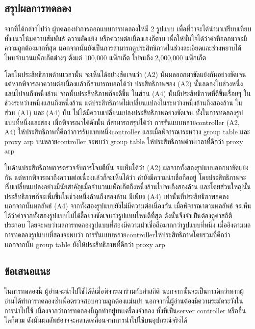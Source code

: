 \subsection{สรุปผลการทดลอง}

จากที่ได้กล่าวไปว่า ผู้ทดลองทำการออกแบบการทดลองให้มี 2 รูปแบบ เพื่อที่ว่าจะได้นำมาเปรียบเทียบ
ทั้งแนวโน้มความสัมพันธ์ ความขัดแย้ง หรือความต่อเนื่องเองก็ตาม เพื่อให้มั่นใจได้ว่าค่าที่ออกมาจะมีความถูกต้องมากที่สุด
นอกจากนั้นยังเป็นการสามารถดูประสิทธิภาพในช่วงละเอียดและช่วงหยาบได้ไหนจำนวนแพ็กเก็ตต่างๆ ตั่งแต่ 100,000 แพ็กเก็ต ไปจนถึง 2,000,000 แพ็กเก็ต

โดยในประสิทธิภาพด้านเวลานั้น จะเห็นได้อย่างชัดเจนว่า (A2) นั้นผลออกมาขัดแย้งกันอย่างชัดเจน แต่หากพิจารณาความต่อเนื่องแล้วก็สามารถบอกได้ว่า
ประสิทธิภาพของ (A2) นั้นลดลงในช่วงหนึ่งแสนไปจนถึงหนึ่งล้าน
จากนั้นประสิทธิภาพก็จะดีขึ้น ในส่วน (A4) นั้นมีประสิทธิภาพที่ดีขึ้นเรื่อยๆ ในช่วงระหว่างหนึ่งแสนถึงหนึ่งล้าน แต่ประสิทธิภาพไม่เปลี่ยนแปลงในระหว่างหนึ่งล้านถึงสองล้าน
ในส่วน (A1) และ (A4) นั้น ไม่ได้มีความเปลี่ยนแปลงประสิทธิภาพอย่างชัดเจน ทั้งในการทดลองรูปแบบที่หนึ่งและสอง
เมื่อพิจารณาได้ดังนั้น ก็สามารถสรุปได้ว่า การรันแบบหลาย\gls{controller} (A2, A4) ให้ประสิทธิภาพที่ดีกว่าการรันแบบหนึ่ง\gls{controller}
และเมื่อพิจารณาระหว่าง group table และ proxy arp บนหลาย\gls{controller} จะพบว่า group table ให้ประสิทธิภาพด้านเวลาที่ดีกว่า proxy arp

ในด้านประสิทธิภาพการตรวจจับการโจมตีนั้น จะเห็นได้ว่า (A2) ผลจากทั้งสองรูปแบบออกมาขัดแย้งกัน แต่หากพิจารณาถึงความต่อเนื่องแล้วก็จะเห็นได้ว่า
ค่ายังมีความน่าเชื่อถืออยู่ โดยประสิทธิภาพจะเริ่มเปลี่ยนแปลงอย่างมีนัยสำคัญเมื่อจำนวนแพ็กเก็ตถึงหนึ่งล้านไปจนถึงสองล้าน
และโดยส่วนใหญ่นั้น ประสิทธิภาพก็จะเพิ่มขึ้นในช่วงหนึ่งล้านถึงสองล้าน มีเพียง (A4) เท่านั้นที่ประสิทธิภาพลดลง นอกจากนั้นผลลัพธ์ (A4) จากทั้งสองรูปแบบยังไม่มีความต่อเนื่องกัน
เมื่อพิจารณาตามผลลัพธ์ จะเห็นได้ว่าค่าจากทั้งสองรูปแบบไม่ได้ชี้อย่างชัดเจนว่ารูปแบบไหนดีที่สุด ดังนั้นจึงจำเป็นต้องดูค่าสถิติประกอบ
โดยจะพบว่าผลการทดลองรูปแบบที่สองมีความน่าเชื่อถือมากกว่ารูปแบบที่หนึ่ง เมื่ออิงตามผลการทดลองรูปแบบที่สองจะพบว่า
การรันแบบหลาย\gls{controller}ให้ประสิทธิภาพโดยรวมที่ดีกว่า นอกจากนั้น group table ยังให้ประสิทธิภาพที่ดีกว่า proxy arp 
\\
\subsection{ข้อเสนอแนะ}

ในการทดลองนี้ ผู้อ่านจะนำไปใช้ได้ดีเมื่อพิจารณาร่วมกับค่าสถิติ นอกจากนั้นจะเป็นการดีกว่าหากผู้อ่านได้ทำการทดลองซ้ำเพื่อตรวจสอบความถูกต้องแม่นยำ
นอกจากนี้ผู้อ่านต้องมีความระมัดระวังในการนำไปใช้ เนื่องจากว่าการทดลองนี้ถูกทำอยู่บนเครื่องจำลอง ทั้งที่เป็น\gls{server} \gls{controller} หรืออื่นใดก็ตาม
ดังนั้นผลลัพธ์อาจจะคลาดเคลื่อนจากการนำไปใช้บนอุปกรณ์จริงได้